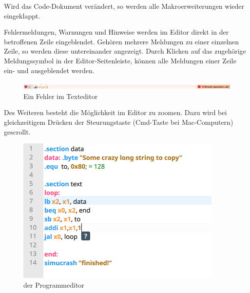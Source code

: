Wird das Code-Dokument verändert, so werden alle Makroerweiterungen wieder
eingeklappt.

Fehlermeldungen, Warnungen und Hinweise werden im Editor direkt in der
betroffenen Zeile eingeblendet. Gehören mehrere Meldungen zu einer einzelnen
Zeile, so werden diese untereinander angezeigt. Durch Klicken auf das zugehörige
Meldungssymbol in der Editor-Seitenleiste, können alle Meldungen einer Zeile
ein- und ausgeblendet werden.

\begin{figure}[ht]
	\centering
  \includegraphics[width=\textwidth]{Images/Editor_error}
	\caption{Ein Fehler im Texteditor}
	\label{Editor_Error}
\end{figure}

Des Weiteren besteht die Möglichkeit im Editor zu zoomen. Dazu wird bei
gleichzeitigem Drücken der Steurungstaste (Cmd-Taste bei Mac-Computern)
gescrollt.

\begin{figure}[ht]
	\centering
  \includegraphics[scale=1]{Images/Editor}
	\caption{der Programmeditor}
	\label{Editor}
\end{figure}


